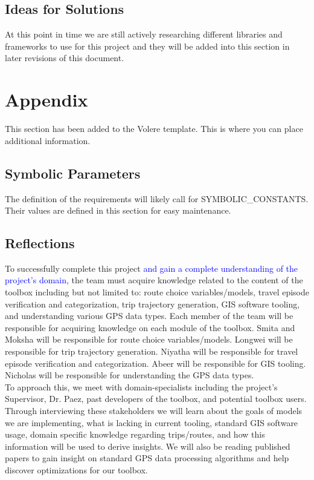 \documentclass[12pt, titlepage]{article}
\begin{document}
\subsection{Ideas for Solutions}
At this point in time we are still actively researching different libraries and frameworks to use for this project and they will be added into this section in later revisions of this document. 

\newpage

\section{Appendix}
This section has been added to the Volere template.  This is where you can place
additional information.

\subsection{Symbolic Parameters}

The definition of the requirements will likely call for SYMBOLIC\_CONSTANTS.
Their values are defined in this section for easy maintenance.

\subsection{Reflections}

To successfully complete this project \textcolor{blue}{and gain a complete understanding of the project's domain}, the team must acquire knowledge related to the content of the toolbox including but not limited to: route choice variables/models, travel episode verification and categorization, trip trajectory generation, GIS software tooling, and understanding various GPS data types. Each member of the team will be responsible for acquiring knowledge on each module of the toolbox. Smita and Moksha will be responsible for route choice variables/models. Longwei will be responsible for trip trajectory generation. Niyatha will be responsible for travel episode verification and categorization. Abeer will be responsible for GIS tooling. Nicholas will be responsible for understanding the GPS data types.\\

\noident To approach this, we meet with domain-specialists including the project's Supervisor, Dr. Paez, past developers of the toolbox, and potential toolbox users. Through interviewing these stakeholders we will learn about the goals of models we are implementing, what is lacking in current tooling, standard GIS software usage, domain specific knowledge regarding trips/routes, and how this information will be used to derive insights. We will also be reading published papers to gain insight on standard GPS data processing algorithms and help discover optimizations for our toolbox.\\
\end{document}
